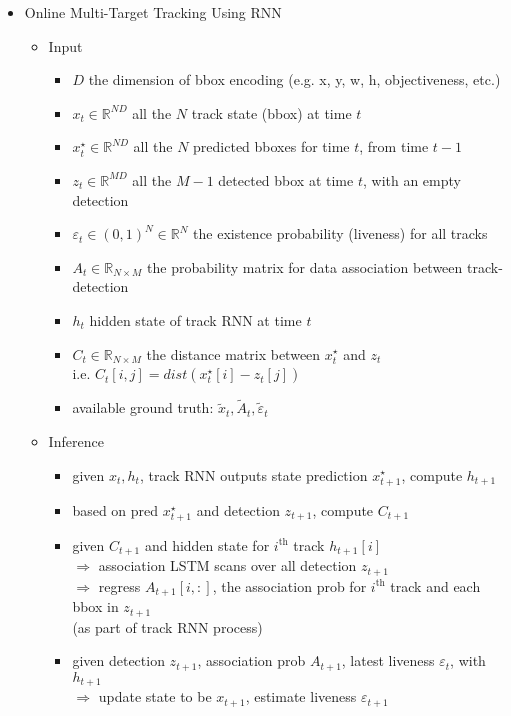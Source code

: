 \begin{itemize}
\item Online Multi-Target Tracking Using RNN
	\begin{itemize}
	\item Input
		\begin{itemize}
		\item $D$ the dimension of bbox encoding (e.g. x, y, w, h, objectiveness, etc.)
		\item $x_t\in \mathbb{R}^{ND}$ all the $N$ track state (bbox) at time $t$
		\item $x^\star_{t} \in\mathbb{R}^{ND}$ all the $N$ predicted bboxes for time $t$, from time $t-1$
		\item $z_t\in \mathbb{R}^{MD}$ all the $M-1$ detected bbox at time $t$, with an empty detection
		\item $\varepsilon_t\in(0,1)^N  \in\mathbb R^N$ the existence probability (liveness) for all tracks
		\item $A_t \in \mathbb{R}_{N\times M}$ the probability matrix for data association between track-detection
		\item $h_t$ hidden state of track RNN at time $t$
		\item $C_t \in \mathbb{R}_{N\times M}$ the distance matrix between $x^\star_{t}$ and $z_t$ \\ 
		i.e. $C_t[i,j] = dist(x^\star_{t}[i] - z_t[j])$
		\item available ground truth: $\widetilde x_t, \widetilde A_t, \widetilde \varepsilon_t$
		\end{itemize}
	\item Inference
		\begin{itemize}
		\item given $x_t,h_t$, track RNN outputs state prediction $x^\star_{t+1}$, compute $h_{t+1}$
		\item based on pred $x^\star_{t+1}$ and detection $z_{t+1}$, compute $C_{t+1}$
		\item given $C_{t+1}$ and hidden state for $i^\text{th}$ track $h_{t+1}[i]$ \\ 
		$\Rightarrow$ association LSTM scans over all detection $z_{t+1}$ \\
		$\Rightarrow$ regress $A_{t+1}[i, :]$, the association prob for $i^\text{th}$ track and each bbox in $z_{t+1}$ \\
		(as part of track RNN process)
		\item given detection $z_{t+1}$, association prob $A_{t+1}$, latest liveness $\varepsilon_t$, with $h_{t+1}$ \\ 
		$\Rightarrow$ update state to be $x_{t+1}$, estimate liveness $\varepsilon_{t+1}$

\end{itemize}
\end{itemize}
\end{itemize}
